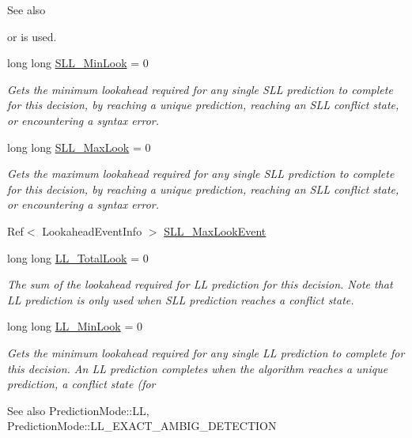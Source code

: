 \begin{DoxyCompactItemize}
\begin{DoxyCompactList}
\begin{DoxySeeAlso}{See also}
\end{DoxySeeAlso}
or  is used. \end{DoxyCompactList}\item 
long long \hyperlink{classantlr4_1_1atn_1_1DecisionInfo_a8ab55352ff7f6a4598f96291377780e8}{S\+L\+L\+\_\+\+Min\+Look} = 0
\begin{DoxyCompactList}\small\item\em Gets the minimum lookahead required for any single S\+LL prediction to complete for this decision, by reaching a unique prediction, reaching an S\+LL conflict state, or encountering a syntax error. \end{DoxyCompactList}\item 
long long \hyperlink{classantlr4_1_1atn_1_1DecisionInfo_a79f953eada792e1239b292a4a2163138}{S\+L\+L\+\_\+\+Max\+Look} = 0
\begin{DoxyCompactList}\small\item\em Gets the maximum lookahead required for any single S\+LL prediction to complete for this decision, by reaching a unique prediction, reaching an S\+LL conflict state, or encountering a syntax error. \end{DoxyCompactList}\item 
Ref$<$ Lookahead\+Event\+Info $>$ \hyperlink{classantlr4_1_1atn_1_1DecisionInfo_a85c7fd7170cfc98eef6434ff7221ac9d}{S\+L\+L\+\_\+\+Max\+Look\+Event}
\item 
long long \hyperlink{classantlr4_1_1atn_1_1DecisionInfo_a74ee8e588415c652036556738bdd2a04}{L\+L\+\_\+\+Total\+Look} = 0
\begin{DoxyCompactList}\small\item\em The sum of the lookahead required for LL prediction for this decision. Note that LL prediction is only used when S\+LL prediction reaches a conflict state. \end{DoxyCompactList}\item 
long long \hyperlink{classantlr4_1_1atn_1_1DecisionInfo_a98a55749390e7acf3db64bef3fed7e90}{L\+L\+\_\+\+Min\+Look} = 0
\begin{DoxyCompactList}\small\item\em Gets the minimum lookahead required for any single LL prediction to complete for this decision. An LL prediction completes when the algorithm reaches a unique prediction, a conflict state (for \begin{DoxySeeAlso}{See also}
Prediction\+Mode\+::\+LL, Prediction\+Mode\+::\+L\+L\+\_\+\+E\+X\+A\+C\+T\+\_\+\+A\+M\+B\+I\+G\+\_\+\+D\+E\+T\+E\+C\+T\+I\+ON



\end{DoxySeeAlso}
\end{DoxyCompactList}
\end{DoxyCompactItemize}
